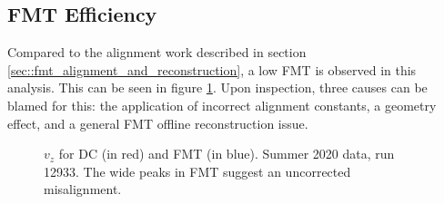 \subsection{FMT Efficiency}
    Compared to the alignment work described in section \ref{sec::fmt_alignment_and_reconstruction}, a low FMT is observed in this analysis.
    This can be seen in figure \ref{fig::vz_012933}.
    Upon inspection, three causes can be blamed for this: the application of incorrect alignment constants, a geometry effect, and a general FMT offline reconstruction issue.

    \begin{figure}[b!]
        \centering{}
        \caption[$v_z$ for DC and FMT, run 12933]{$v_z$ for DC (in red) and FMT (in blue). Summer 2020 data, run 12933. The wide peaks in FMT suggest an uncorrected misalignment.}
        \label{fig::vz_012933}
    \end{figure}

    
    
    
    
